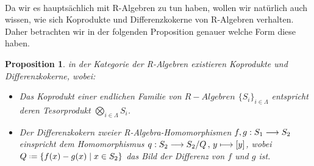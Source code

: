 \documentclass[10pt,a4paper]{report}
\newcounter{Aussage}[chapter]
\newtheorem{prop}[Aussage]{Proposition}
\newcommand{\functionfront}[3]{\nolinebreak{#1:#2 \longrightarrow #3}}
\newcommand{\function}[5]{\nolinebreak{#1:#2 \longrightarrow #3 \, , \, #4 \longmapsto #5}}
\newcommand*{\defeq}{\mathrel{\vcenter{\baselineskip0.5ex \lineskiplimit0pt
                     \hbox{\scriptsize.}\hbox{\scriptsize.}}}%
                     =}
\begin{document}
\ \\
Da wir es hauptsächlich mit R-Algebren zu tun haben, wollen wir natürlich auch wissen, wie sich Koprodukte und Differenzkokerne von R-Algebren verhalten. Daher betrachten wir in der folgenden Proposition genauer welche Form diese haben.
\begin{prop} \label{R-Algebra-Kolimiten}
in der Kategorie der R-Algebren existieren Koprodukte und Differenzkokerne, wobei:
\begin{itemize}
\item[\textbf{1.}] Das Koprodukt einer endlichen Familie von $R-Algebren$ $\lbrace S_i \rbrace_{i \in \Lambda}$ entspricht deren Tesorprodukt $\bigotimes_{i \in \Lambda} S_i$. 
\item[\textbf{2.}] Der Differenzkokern zweier R-Algebra-Homomorphismen $\functionfront{f,g}{S_1}{S_2}$ einspricht dem Homomorphismus $\function{q}{S_2}{S_2/Q}{y}{[y]}$, wobei $Q \defeq \lbrace f(x) - g(x)\mid x \in S_2 \rbrace$ das Bild der Differenz von $f$ und $g$ ist.
\end{itemize}
\end{prop}
\end{document}
